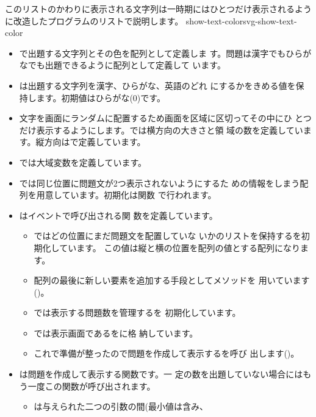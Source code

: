 このリストのかわりに表示される文字列は一時期にはひとつだけ表示されるよう
に改造したプログラムのリストで説明します。
{}
    {show-text-color}{svg-show-text-color}
\begin{itemize}
 \item {}で出題する文字列とその色を配列として定義しま
       す。問題は漢字でもひらがなでも出題できるように配列として定義して
       います。
 \item {}は出題する文字列を漢字、ひらがな、英語のどれ
       にするかをきめる値を保持します。初期値はひらがな($0$)です。
 \item 文字を画面にランダムに配置するため画面を区域に区切ってその中にひ
       とつだけ表示するようにします。では横方向の大きさと領
       域の数を定義しています。縦方向はで定義しています。
 \item {}では大域変数を定義しています。
 \item {}では同じ位置に問題文が2つ表示されないようにするた
       めの情報をしまう配列を用意しています。初期化は関数
       で行われます。
 \item {}はイベントで呼び出される関
       数を定義しています。
\begin{itemize}
 \item {}ではどの位置にまだ問題文を配置していな
       いかのリストを保持するを初期化しています。
       この値は縦と横の位置を配列の値とする配列になります。
 \item 配列の最後に新しい要素を追加する手段としてメソッドを
       用いています()。
 \item {}では表示する問題数を管理するを
       初期化しています。
 \item {}では表示画面であるをに格
       納しています。
 \item これで準備が整ったので問題を作成して表示するを呼び
       出します()。
\end{itemize}
 \item {}は問題を作成して表示する関数です。一
       定の数を出題していない場合にはもう一度この関数が呼び出されます。
\begin{itemize}
 \item {}は与えられた二つの引数の間(最小値は含み、

\end{itemize}
\end{itemize}
